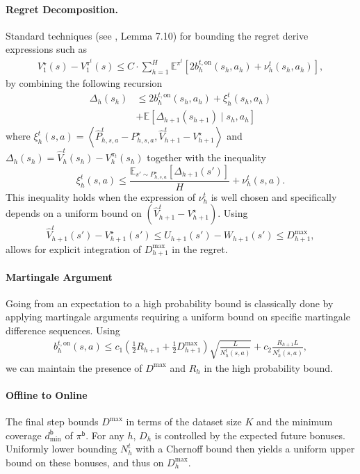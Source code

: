 \documentclass[twoside]{article}
\newcommand{\on}{\mathrm{on}} %
\newcommand{\bont}{b_h^{t,\on}} %
\newcommand{\lowv}{W} %
\newcommand{\highv}{U} %
\begin{document}
\paragraph{Regret Decomposition.} Standard techniques (see \cite{agarwal2019reinforcement}, Lemma 7.10) for bounding the regret derive expressions such as
\begin{align*}
V^\star_{1}(s)-V^{\pi^t}_{1}(s)
 {\le} C \cdot
\sum_{h=1}^{H}\mathbb{E}^{\pi^t} \left[2\bont(s_h,a_h) + \nu_h^t(s_h,a_h) \right],
\end{align*}
by combining the following recursion
\begin{align*}
\Delta_h(s_h) &\le 2\bont(s_h,a_h) + \xi_h^{t}(s_h,a_h) \\
&+ \mathbb{E} \left[\Delta_{h+1}(s_{h+1})\mid s_h,a_h\right]
\end{align*}
where $\xi_h^{t}(s,a){=}\left \langle \widehat{P}_{h,s,a}^{t} -P_{h,s,a}^{\star}, \widehat{V}_{h+1}^t - V_{h+1}^\star \right \rangle$ and $\Delta_h(s_h){=} \widehat{V}^t_h(s_h){-} V^{\pi_t}_h(s_h)$ together with the inequality 
\[
\xi_h^{t}(s,a) \le \frac{\mathbb{E}_{s' \sim P_{h,s,a}^{\star}} \left[ \Delta_{h+1}(s') \right]}{H} + \nu_h^{t}(s,a).
\]
This inequality holds when the expression of $\nu_h^{t}$ is well chosen and specifically depends on a uniform bound on  $(\widehat{V}_{h+1}^t - V_{h+1}^\star)$. Using 
\[ 
\widehat{V}_{h+1}^t(s') - V_{h+1}^\star(s') \le \highv_{h+1}(s') - \lowv_{h+1}(s') \le D_{h+1}^{\max},
\]
allows for explicit integration of $D_{h+1}^{\max}$ in the regret.
\paragraph{Martingale Argument} Going from an expectation to a high probability bound is classically done by applying martingale arguments \cite{hoeffding_probability_1963, azuma_weighted_1967}  requiring a uniform bound on specific martingale difference sequences. Using
\begin{align*}
\bont(s,a){\le} 
c_1\left(\tfrac12R_{h+1}{+} \tfrac12 D^{\max}_{h+1}\right)\sqrt{\frac{L}{N_h^t(s,a)}}{+} 
c_2\frac{R_{h+1}L}{N_h^t(s,a)},
\end{align*}
we can maintain the presence of $D^{\max}$ and $R_h$ in the high probability bound.

\paragraph{Offline to Online} The final step bounds $D^{\max}$ in terms of the dataset size $K$ and the minimum coverage $d^{\mathsf b}_{\min}$ of $\pi^{\mathsf b}$. For any $h$, $D_h$ is controlled by the expected future bonuses. Uniformly lower bounding $N_h^t$ with a Chernoff bound then yields a uniform upper bound on these bonuses, and thus on $D_h^{\max}$.
\end{document}
